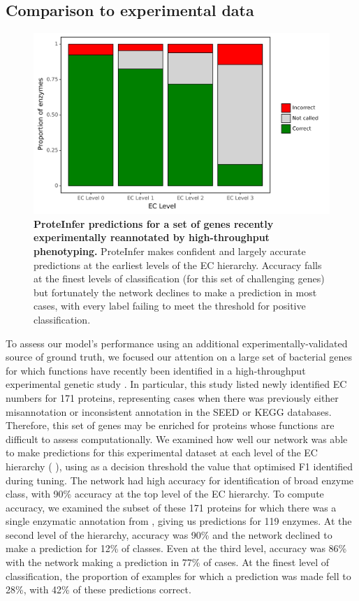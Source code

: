 \subsection*{Comparison to experimental data}
\begin{figure}[t]
\centering
  \includegraphics[width=\columnwidth]{Figures/price.png}%
  \caption{\textbf{ProteInfer predictions for a set of genes recently experimentally reannotated by high-throughput phenotyping.} ProteInfer makes confident and largely accurate predictions at the earliest levels of the EC hierarchy. Accuracy falls at the finest levels of classification (for this set of challenging genes) but fortunately the network declines to make a prediction in most cases, with every label failing to meet the threshold for positive classification. \label{fig:levels}}
\end{figure}

To assess our model's performance using an additional experimentally-validated source of ground truth, we focused our attention on a large set of bacterial genes for which functions have recently been identified in a high-throughput experimental genetic study \citep{phenotypes}. In particular, this study listed newly identified EC numbers for 171 proteins, representing cases when there was previously either misannotation or inconsistent annotation in the SEED or KEGG databases. Therefore, this set of genes may be enriched for proteins whose functions are difficult to assess computationally.
We examined how well our network was able to make predictions for this experimental dataset at each level of the EC hierarchy (%
), using as a decision threshold the value that optimised F1 identified during tuning. The network had high accuracy for identification of broad enzyme class, with 90\% accuracy at the top level of the EC hierarchy. To compute accuracy, we examined the subset of these 171 proteins for which there was a single enzymatic annotation from \cite{phenotypes}, giving us predictions for 119 enzymes. At the second level of the hierarchy, accuracy was 90\% and the network declined to make a prediction for 12\% of classes. Even at the third level, accuracy was 86\% with the network making a prediction in 77\% of cases. At the finest level of classification, the proportion of examples for which a prediction was made fell to 28\%, with 42\% of these predictions correct.

